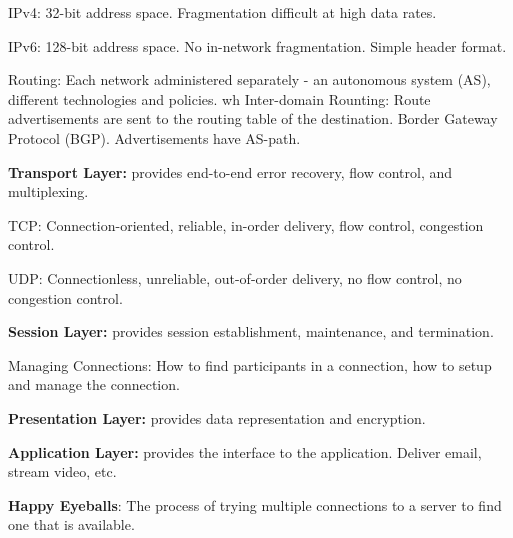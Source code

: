\documentclass{article}
\begin{document}
\noindent IPv4: 32-bit address space. Fragmentation difficult at high data rates.

\noindent IPv6: 128-bit address space. No in-network fragmentation. Simple header format.

\noindent Routing: Each network administered separately - an autonomous system (AS), different technologies and policies.
wh
\noindent Inter-domain Rounting: Route advertisements are sent to the routing table of the destination. Border Gateway Protocol (BGP). Advertisements have AS-path.


\noindent \textbf{Transport Layer:} provides end-to-end error recovery, flow control, and multiplexing.

\noindent TCP: Connection-oriented, reliable, in-order delivery, flow control, congestion control.

\noindent UDP: Connectionless, unreliable, out-of-order delivery, no flow control, no congestion control.


\noindent \textbf{Session Layer:} provides session establishment, maintenance, and termination.

\noindent Managing Connections: How to find participants in a connection, how to setup and manage the connection.

\noindent \textbf{Presentation Layer:} provides data representation and encryption.

\noindent \textbf{Application Layer:} provides the interface to the application. Deliver email, stream video, etc.

\noindent \textbf{Happy Eyeballs}: The process of trying multiple connections to a server to find one that is available.
\end{document}
